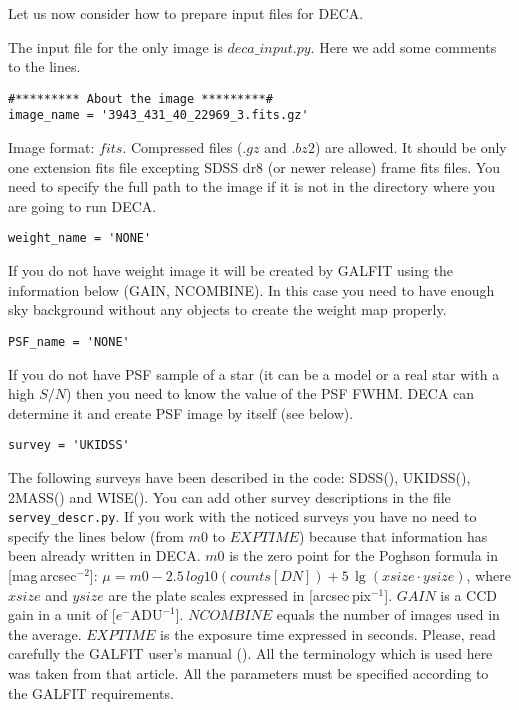\documentclass[
aps,%
12pt,%
final,%
notitlepage,%
oneside,%
onecolumn,%
nobibnotes,%
nofootinbib,%
superscriptaddress,%
noshowpacs,%
centertags]%
{revtex4}
\begin{document}
Let us now consider how to prepare input files for DECA. 

The input file for the only image is $deca\_input.py$. Here we add some comments to the lines.

\begin{verbatim}
#********* About the image *********#
image_name = '3943_431_40_22969_3.fits.gz' 	
\end{verbatim}
	Image format: $fits$. Compressed files ($.gz$ and $.bz2$) are allowed. It should be only one extension fits file excepting SDSS dr8 (or newer release) frame fits files. You need to specify the full path to the image if it is not in the directory where you are going to run DECA.   

\begin{verbatim}
weight_name = 'NONE' 				
\end{verbatim}
	If you do not have weight image it will be created by GALFIT using the information below (GAIN, NCOMBINE). In this case you need to have enough sky background without any objects to create the weight map properly.

\begin{verbatim} 
PSF_name = 'NONE'			   	
\end{verbatim}
	If you do not have PSF sample of a star (it can be a model or a real star with a high $S/N$) then you need to know the value of the PSF FWHM. DECA can determine it and create PSF image by itself (see below).

\begin{verbatim}
survey = 'UKIDSS' 				
\end{verbatim}
	The following surveys have been described in the code: SDSS(\cite{Ahn}), UKIDSS(\cite{Lawrence}), 2MASS(\cite{Skrutskie}) and WISE(\cite{Wright}). You can add other survey descriptions in the file \texttt{servey\_descr.py}.
	If you work with the noticed surveys you have no need to specify the lines below (from $m0$ to $EXPTIME$) because that information has been already written in DECA. $m0$ is the zero point for the Poghson formula in [mag$\,$arcsec$^{-2}$]: $\mu=m0 - 2.5\,log10(counts[DN]) + 5\,\lg(xsize\cdot ysize)$, where $xsize$ and $ysize$ are the plate scales expressed in [arcsec$\,$pix$^{-1}$]. $GAIN$ is a CCD gain in a unit of [$e^{-}\mathrm{ADU}^{-1}$]. $NCOMBINE$ equals the number of images used in the average. $EXPTIME$ is the exposure time expressed in seconds. Please, read carefully the GALFIT user's manual (\cite{Peng}). All the terminology which is used here was taken from that article. All the parameters must be specified according to the GALFIT requirements.
\end{document}
